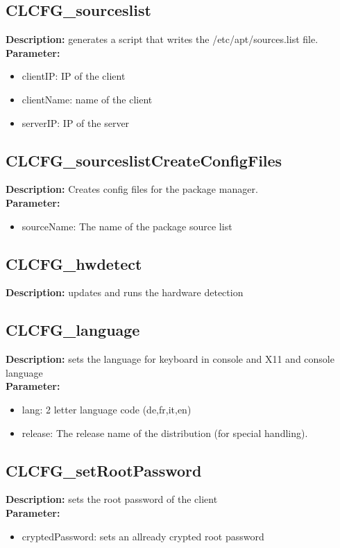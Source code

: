 \subsection{CLCFG\_sourceslist}
\textbf{Description:} generates a script that writes the /etc/apt/sources.list file.\\
\textbf{Parameter:}
\begin{itemize}
\item clientIP: IP of the client
\item clientName: name of the client
\item serverIP: IP of the server
\end{itemize}

\subsection{CLCFG\_sourceslistCreateConfigFiles}
\textbf{Description:} Creates config files for the package manager.\\
\textbf{Parameter:}
\begin{itemize}
\item sourceName: The name of the package source list
\end{itemize}

\subsection{CLCFG\_hwdetect}
\textbf{Description:} updates and runs the hardware detection\\

\subsection{CLCFG\_language}
\textbf{Description:} sets the language for keyboard in console and X11 and console language\\
\textbf{Parameter:}
\begin{itemize}
\item lang: 2 letter language code (de,fr,it,en)
\item release: The release name of the distribution (for special handling).
\end{itemize}

\subsection{CLCFG\_setRootPassword}
\textbf{Description:} sets the root password of the client\\
\textbf{Parameter:}
\begin{itemize}
\item cryptedPassword: sets an allready crypted root password
\end{itemize}

